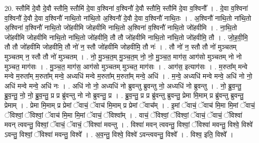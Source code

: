 \documentclass[17pt]{extarticle}
\begin{document}
20. स्तौमि॑ दे॒वौ दे॒वौ स्तौमि॒ स्तौमि॑ दे॒वा व॒श्विना॑ व॒श्विनौ॑ दे॒वौ स्तौमि॒ स्तौमि॑ दे॒वा व॒श्विनौ᳚ । . दे॒वा व॒श्विना॑ व॒श्विनौ॑ दे॒वौ दे॒वा व॒श्विनौ॑ नाथि॒तो ना॑थि॒तो अ॒श्विनौ॑ दे॒वौ दे॒वा व॒श्विनौ॑ नाथि॒तः । . अ॒श्विनौ॑ नाथि॒तो ना॑थि॒तो अ॒श्विना॑ व॒श्विनौ॑ नाथि॒तो जो॑हवीमि जोहवीमि नाथि॒तो अ॒श्विना॑ व॒श्विनौ॑ नाथि॒तो जो॑हवीमि । . ना॒थि॒तो जो॑हवीमि जोहवीमि नाथि॒तो ना॑थि॒तो जो॑हवीमि॒ तौ तौ जो॑हवीमि नाथि॒तो ना॑थि॒तो जो॑हवीमि॒ तौ । . जो॒ह॒वी॒मि॒ तौ तौ जो॑हवीमि जोहवीमि॒ तौ नो॑ न॒ स्तौ जो॑हवीमि जोहवीमि॒ तौ नः॑ । . तौ नो॑ न॒ स्तौ तौ नो॑ मुञ्चतम् मुञ्चतम् न॒ स्तौ तौ नो॑ मुञ्चतम् । . नो॒ मु॒ञ्च॒त॒म् मु॒ञ्च॒त॒म् नो॒ नो॒ मु॒ञ्च॒त॒ माग॑स॒ आग॑सो मुञ्चतम् नो नो मुञ्चत॒ माग॑सः । . मु॒ञ्च॒त॒ माग॑स॒ आग॑सो मुञ्चतम् मुञ्चत॒ माग॑सः । . आग॑स॒ इत्याग॑सः । . म॒रुता᳚म् मन्वे मन्वे म॒रुता᳚म् म॒रुता᳚म् मन्वे॒ अध्यधि॑ मन्वे म॒रुता᳚म् म॒रुता᳚म् मन्वे॒ अधि॑ । . म॒न्वे॒ अध्यधि॑ मन्वे मन्वे॒ अधि॑ नो नो॒ अधि॑ मन्वे मन्वे॒ अधि॑ नः । . अधि॑ नो नो॒ अध्यधि॑ नो ब्रुवन्तु ब्रुवन्तु नो॒ अध्यधि॑ नो ब्रुवन्तु । . नो॒ ब्रु॒व॒न्तु॒ ब्रु॒व॒न्तु॒ नो॒ नो॒ ब्रु॒व॒न्तु॒ प्र प्र ब्रु॑वन्तु नो नो ब्रुवन्तु॒ प्र । . ब्रु॒व॒न्तु॒ प्र प्र ब्रु॑वन्तु ब्रुवन्तु॒ प्रेमा मि॒माम् प्र ब्रु॑वन्तु ब्रुवन्तु॒ प्रेमाम् । . प्रेमा मि॒माम् प्र प्रेमां ॅवाचं॒ ॅवाच॑ मि॒माम् प्र प्रेमां ॅवाच᳚म् । . इ॒मां ॅवाचं॒ ॅवाच॑ मि॒मा मि॒मां ॅवाचं॒ ॅविश्वां॒ ॅविश्वां॒ ॅवाच॑ मि॒मा मि॒मां ॅवाचं॒ ॅविश्वा᳚म् । . वाचं॒ ॅविश्वां॒ ॅविश्वां॒ ॅवाचं॒ ॅवाचं॒ ॅविश्वा॑ मवन् त्ववन्तु॒ विश्वां॒ ॅवाचं॒ ॅवाचं॒ ॅविश्वा॑ मवन्तु । . विश्वा॑ मवन् त्ववन्तु॒ विश्वां॒ ॅविश्वा॑ मवन्तु॒ विश्वे॒ विश्वे॑ ऽवन्तु॒ विश्वां॒ ॅविश्वा॑ मवन्तु॒ विश्वे᳚ । . अ॒व॒न्तु॒ विश्वे॒ विश्वे॑ ऽवन्त्ववन्तु॒ विश्वे᳚ । . विश्व॒ इति॒ विश्वे᳚ । \newline
\end{document}
